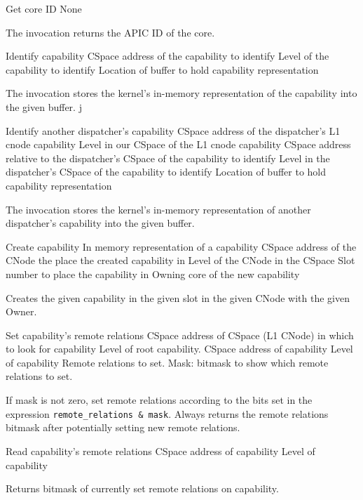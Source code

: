 \begin{invocation}{Get core ID}
  \arg None
\end{invocation}
The invocation returns the APIC ID of the core.

\begin{invocation}{Identify capability}
  \arg CSpace address of the capability to identify
  \arg Level of the capability to identify
  \arg Location of buffer to hold capability representation
\end{invocation}
The invocation stores the kernel's in-memory representation of the
capability into the given buffer.
j
\begin{invocation}{Identify another dispatcher's capability}
  \arg CSpace address of the dispatcher's L1 cnode capability
  \arg Level in our CSpace of the L1 cnode capability
  \arg CSpace address relative to the dispatcher's CSpace of the capability to
  identify
  \arg Level in the dispatcher's CSpace of the capability to identify
  \arg Location of buffer to hold capability representation
\end{invocation}
The invocation stores the kernel's in-memory representation of another
dispatcher's capability into the given buffer.

\begin{invocation}{Create capability}
  \arg In memory representation of a capability
  \arg CSpace address of the CNode the place the created capability in
  \arg Level of the CNode in the CSpace
  \arg Slot number to place the capability in
  \arg Owning core of the new capability
\end{invocation}
Creates the given capability in the given slot in the given CNode with the
given Owner.


\begin{invocation}{Set capability's remote relations}
  \arg CSpace address of CSpace (L1 CNode) in which to look for capability
  \arg Level of root capability.
  \arg CSpace address of capability
  \arg Level of capability
  \arg Remote relations to set.
  \arg Mask: bitmask to show which remote relations to set.
\end{invocation}
If mask is not zero, set remote relations according to the bits set in the
expression \verb|remote_relations & mask|.
Always returns the remote relations bitmask after potentially setting new
remote relations.

\begin{invocation}{Read capability's remote relations}
  \arg CSpace address of capability
  \arg Level of capability
\end{invocation}
Returns bitmask of currently set remote relations on capability.

